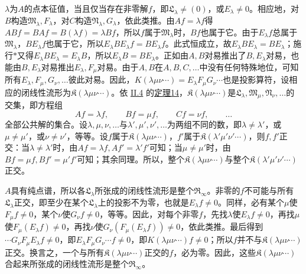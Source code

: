 \documentclass[fontsize=13pt,twoside,openany,headings=normal,parskip=false,bookmarkpackage=false,DIV=calc]{scrbook}
\begin{document}
\hypertarget{origpage-91}{}\label{origpage-91}$\lambda$为$A$的点本征值，当且仅当存在非零解$f$，即$\mathfrak L_\lambda\ne(0)$，或$E_\lambda\ne0$。相应地，对$B$构造$\mathfrak M_\lambda,\allowbreak F_\lambda$，对$C$构造$\mathfrak N_\lambda,\allowbreak G_\lambda$，依此类推。由$Af=\lambda f$得$ABf=BAf=B(\lambda f)=\lambda Bf$，所以$f$属于$\mathfrak M_\lambda$时，$Bf$也属于它。由于$E_\lambda f$总属于$\mathfrak M_\lambda$，$BE_\lambda f$也属于它，所以$E_\lambda BE_\lambda f=BE_\lambda f$。此式恒成立，故$E_\lambda BE_\lambda=BE_\lambda$；施行$*$又得$E_\lambda BE_\lambda=E_\lambda B$，所以$E_\lambda B=BE_\lambda$。正如由$A,\allowbreak B$对易推出了$B,\allowbreak E_\lambda$对易，也能由$B,\allowbreak E_\lambda$对易推出$E_\lambda,\allowbreak F_\mu$对易。由于$A,\allowbreak B$在$A,\allowbreak B,\allowbreak C,\allowbreak \ldots$中没有任何特殊地位，可知所有$E_\lambda,\allowbreak F_\mu,\allowbreak G_\nu,\allowbreak \ldots$彼此对易。因此，$K(\lambda\mu\nu\cdots)=E_\lambda F_\mu G_\nu\cdots$也是投影算符，设相应的闭线性流形为$\mathfrak K(\lambda\mu\nu\cdots)$。依 \hyperref[sec:II.4]{II.4} 的\CJKglue \hyperref[thm:II.14]{定理14}，$\mathfrak K(\lambda\mu\nu\cdots)$是$\mathfrak L_\lambda,\allowbreak \mathfrak M_\mu,\allowbreak \mathfrak N_\nu,\allowbreak \ldots$的交集，即方程组
\[
Af=\lambda f,\qquad Bf=\mu f,\qquad Cf=\nu f,\qquad\ldots
\]
全部公共解的集合。设$\lambda,\allowbreak \mu,\allowbreak \nu,\allowbreak \ldots$与$\lambda',\allowbreak \mu',\allowbreak \nu',\allowbreak \ldots$为两组不同的数，即$\lambda\ne\lambda'$，或$\mu\ne\mu'$，或$\nu\ne\nu'$，等等。设$f$属于$\mathfrak K(\lambda\mu\nu\cdots)$，$f'$属于$\mathfrak K(\lambda'\mu'\nu'\cdots)$，则$f,\allowbreak f'$正交：当$\lambda\ne\lambda'$时，由$Af=\lambda f,\allowbreak Af'=\lambda'f'$可知；当$\mu\ne\mu'$时，由$Bf=\mu f,\allowbreak Bf'=\mu'f'$可知；其余同理。所以，整个$\mathfrak K(\lambda\mu\nu\cdots)$与整个$\mathfrak K(\lambda'\mu'\nu'\cdots)$正交。

$A$具有纯点谱，所以各$\mathfrak L_\lambda$所张成的闭线性流形是整个$\mathfrak R_\infty$。非零的$f$不可能与所有$\mathfrak L_\lambda$正交，即至少在某个$\mathfrak L_\lambda$上的投影不为零，也就是$E_\lambda f\ne0$。同样，必有某个$\mu$使$F_\mu f\ne0$，某个$\nu$使$G_\nu f\ne0$，等等。因此，对每个非零$f$，先找$\lambda$使$E_\lambda f\ne0$，再找$\mu$使$F_\mu(E_\lambda f)\ne0$，再找$\nu$使$G_\nu(F_\mu(E_\lambda f))\ne0$，依此类推。最后得到$\cdots G_\nu F_\mu E_\lambda f\ne0$，即$E_\lambda F_\mu G_\nu\cdots f\ne0$，即$K(\lambda\mu\nu\cdots)f\ne0$；所以$f$并不与$\mathfrak K(\lambda\mu\nu\cdots)$正交。换言之，一个与所有$\mathfrak K(\lambda\mu\nu\cdots)$正交的$f$，必为零。因此，这些$\mathfrak K(\lambda\mu\nu\cdots)$合起来所张成的闭线性流形是整个$\mathfrak R_\infty$。
\end{document}
